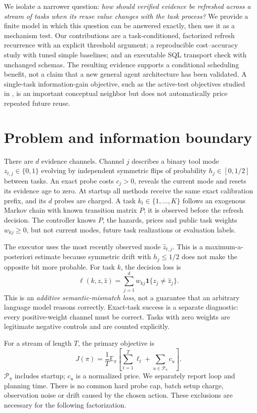 \documentclass[10pt,letterpaper]{article}
\newcommand{\E}{\mathbb{E}}
\newcommand{\ind}{\mathbf{1}}
\begin{document}
We isolate a narrower question: \emph{how should verified evidence be refreshed across a stream of tasks when its reuse value changes with the task process?} We provide a finite model in which this question can be answered exactly, then use it as a mechanism test. Our contributions are a task-conditioned, factorized refresh recurrence with an explicit threshold argument; a reproducible cost--accuracy study with tuned simple baselines; and an executable SQL transport check with unchanged schemas. The resulting evidence supports a conditional scheduling benefit, not a claim that a new general agent architecture has been validated. A single-task information-gain objective, such as the active-test objectives studied in \cite{ec2}, is an important conceptual neighbor but does not automatically price repeated future reuse.

\section{Problem and information boundary}
There are $d$ evidence channels. Channel $j$ describes a binary tool mode $z_{t,j}\in\{0,1\}$ evolving by independent symmetric flips of probability $h_j\in[0,1/2]$ between tasks. An exact probe costs $c_j>0$, reveals the current mode and resets its evidence age to zero. At startup all methods receive the same exact calibration prefix, and its $d$ probes are charged. A task $k_t\in\{1,\ldots,K\}$ follows an exogenous Markov chain with known transition matrix $P$; it is observed before the refresh decision. The controller knows $P$, the hazards, prices and public task weights $w_{kj}\geq0$, but not current modes, future task realizations or evaluation labels.

The executor uses the most recently observed mode $\widehat z_{t,j}$. This is a maximum-a-posteriori estimate because symmetric drift with $h_j\leq1/2$ does not make the opposite bit more probable. For task $k$, the decision loss is
\begin{equation}
 \ell(k,z,\widehat z)=\sum_{j=1}^{d}w_{kj}\ind\{z_j\ne\widehat z_j\}.
 \label{eq:loss}
\end{equation}
This is an \emph{additive semantic-mismatch loss}, not a guarantee that an arbitrary language model reasons correctly. Exact-task success is a separate diagnostic: every positive-weight channel must be correct. Tasks with zero weights are legitimate negative controls and are counted explicitly.

For a stream of length $T$, the primary objective is
\begin{equation}
 J(\pi)=\frac{1}{T}\E_{\pi}\!\left[\sum_{t=1}^{T}\ell_t+
                  \sum_{u\in\mathcal P_\pi}c_u\right].
 \label{eq:objective}
\end{equation}
$\mathcal P_\pi$ includes startup; $c_u$ is a normalized price. We separately report loop and planning time. There is no common hard probe cap, batch setup charge, observation noise or drift caused by the chosen action. These exclusions are necessary for the following factorization.
\end{document}
